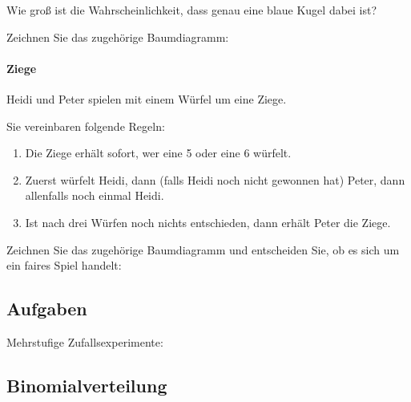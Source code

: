 Wie groß ist die Wahrscheinlichkeit, dass genau eine blaue Kugel dabei ist?

Zeichnen Sie das zugehörige Baumdiagramm:

  
\newpage

\paragraph{Ziege} Heidi und Peter spielen mit einem Würfel um eine Ziege.

Sie vereinbaren folgende Regeln:

\begin{enumerate}
\item Die Ziege erhält sofort, wer eine 5 oder eine 6 würfelt.
\item Zuerst würfelt Heidi, dann (falls Heidi noch nicht gewonnen hat) Peter, dann allenfalls noch einmal Heidi.
\item Ist nach drei Würfen noch nichts entschieden, dann erhält Peter die Ziege.
\end{enumerate}


Zeichnen Sie das zugehörige Baumdiagramm und entscheiden Sie, ob es sich um ein faires Spiel handelt:

\newpage




\subsection*{Aufgaben}

Mehrstufige Zufallsexperimente:

\newpage


\subsection{Binomialverteilung}

